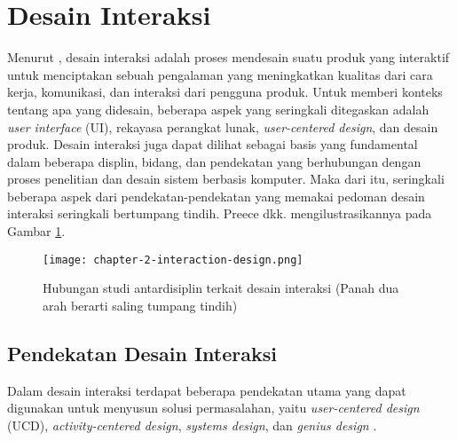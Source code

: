 

\section{Desain Interaksi}

Menurut \textcite{PreeceRogersSharp15}, desain interaksi adalah proses mendesain suatu produk yang interaktif untuk menciptakan sebuah pengalaman yang meningkatkan kualitas dari cara kerja, komunikasi, dan interaksi dari pengguna produk. Untuk memberi konteks tentang apa yang didesain, beberapa aspek yang seringkali ditegaskan adalah \textit{user interface} (UI), rekayasa perangkat lunak, \textit{user-centered design}, dan desain produk. Desain interaksi juga dapat dilihat sebagai basis yang fundamental dalam beberapa displin, bidang, dan pendekatan yang berhubungan dengan proses penelitian dan desain sistem berbasis komputer. Maka dari itu, seringkali beberapa aspek dari pendekatan-pendekatan yang memakai pedoman desain interaksi seringkali bertumpang tindih. Preece dkk. mengilustrasikannya pada Gambar \ref{fig:desain_interaksi}.


\begin{figure}[h]
  \centering
  \texttt{[image: chapter-2-interaction-design.png]}
  \caption{Hubungan studi antardisiplin terkait desain interaksi (Panah dua arah berarti saling tumpang tindih) \textcite{PreeceRogersSharp15}}
  \label{fig:desain_interaksi}
\end{figure}

\FloatBarrier

\subsection{Pendekatan Desain Interaksi}
\label{subsec:pendekatan_id}

Dalam desain interaksi terdapat beberapa pendekatan utama yang dapat digunakan untuk menyusun solusi permasalahan, yaitu \textit{user-centered design} (UCD), \textit{activity-centered design}, \textit{systems design}, dan \textit{genius design} \parencite{saffer2010designing}.

